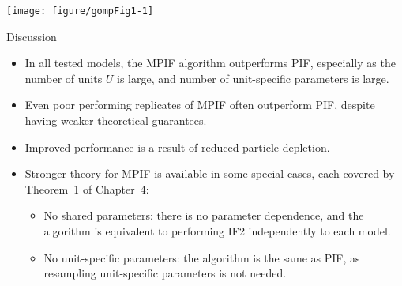 \documentclass[aspectratio=169]{beamer}\usepackage[]{graphicx}\usepackage[]{xcolor}
\makeatletter
\def\maxwidth{ %
  \ifdim\Gin@nat@width>\linewidth
    \linewidth
  \else
    \Gin@nat@width
  \fi
}
\newenvironment{knitrout}{}{} %
\makeatother
\begin{document}
\begin{frame}


\begin{knitrout}
\color{fgcolor}

{\centering \texttt{[image: figure/gompFig1-1]} 

}


\end{knitrout}
\end{frame}

\begin{frame}{Discussion}
  \begin{itemize}
    \item In all tested models, the MPIF algorithm outperforms PIF, especially as the number of units $U$ is large, and number of unit-specific parameters is large.
    \item Even poor performing replicates of MPIF often outperform PIF, despite having weaker theoretical guarantees.
    \item Improved performance is a result of reduced particle depletion.
    \item Stronger theory for MPIF is available in some special cases, each covered by Theorem~1 of Chapter~4:
    \begin{itemize}
      \item No shared parameters: there is no parameter dependence, and the algorithm is equivalent to performing IF2 independently to each model. 
      \item No unit-specific parameters: the algorithm is the same as PIF, as resampling unit-specific parameters is not needed.
    \end{itemize}
  \end{itemize}
\end{frame}
\end{document}
